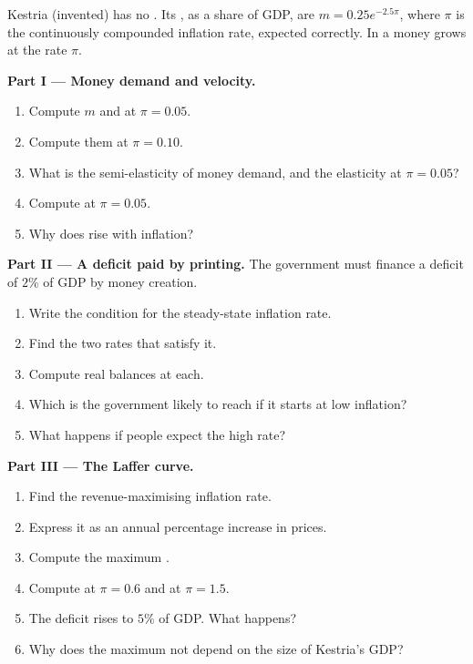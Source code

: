 \begin{problem}\label{pb:b1:money-and-inflation:kestria}
Kestria (invented) has no . Its , as a share
of GDP, are $m = 0.25e^{-2.5\pi}$, where $\pi$ is the continuously compounded inflation
rate, expected correctly. In a  money grows at the rate $\pi$.

\medskip\noindent\textbf{Part I --- Money demand and velocity.}
\begin{enumerate}
  \item Compute $m$ and  at $\pi = 0.05$.
  \item Compute them at $\pi = 0.10$.
  \item What is the semi-elasticity of money demand, and the elasticity at $\pi = 0.05$?
  \item Compute  at $\pi = 0.05$.
  \item Why does  rise with inflation?
\end{enumerate}

\medskip\noindent\textbf{Part II --- A deficit paid by printing.} The government
must finance a deficit of $2\%$ of GDP by money creation.
\begin{enumerate}[resume]
  \item Write the condition for the steady-state inflation rate.
  \item Find the two rates that satisfy it.
  \item Compute real balances at each.
  \item Which is the government likely to reach if it starts at low inflation?
  \item What happens if people expect the high rate?
\end{enumerate}

\medskip\noindent\textbf{Part III --- The Laffer curve.}
\begin{enumerate}[resume]
  \item Find the revenue-maximising inflation rate.
  \item Express it as an annual percentage increase in prices.
  \item Compute the maximum .
  \item Compute  at $\pi = 0.6$ and at $\pi = 1.5$.
  \item The deficit rises to $5\%$ of GDP. What happens?
  \item Why does the maximum not depend on the size of Kestria's GDP?
\end{enumerate}


\end{problem}
